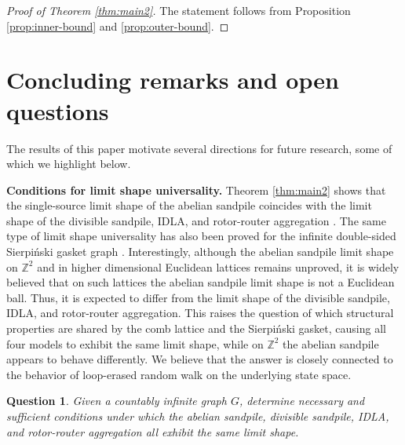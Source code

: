 \documentclass[11pt]{article}
\newtheorem{question}{Question}[section]
\begin{document}
\begin{proof}[Proof of Theorem \ref{thm:main2}]
    The statement follows from Proposition \ref{prop:inner-bound} and \ref{prop:outer-bound}.
\end{proof}

\section{Concluding remarks and open questions}

The results of this paper motivate several directions for future research, some of which we highlight below.

\textbf{Conditions for limit shape universality.} Theorem \ref{thm:main2} shows that the single-source limit shape of the abelian sandpile coincides with the limit shape of the divisible sandpile, IDLA, and rotor-router aggregation \cite{IDLA-comb-2012}. The same type of limit shape universality has also been proved for the infinite double-sided Sierpi\'nski gasket graph \cite{CK20, IDLA-gasket-2020, Div-sand-gasket-2019}. 
Interestingly, although the abelian sandpile limit shape on $\mathbb{Z}^2$ and in higher dimensional Euclidean lattices remains unproved, it is widely believed that on such lattices the abelian sandpile limit shape is not a Euclidean ball. Thus, it is expected to differ from the limit shape of the divisible sandpile, IDLA, and rotor-router aggregation. This raises the question of which structural properties are shared by the comb lattice and the Sierpi\'nski gasket, causing all four models to exhibit the same limit shape, while on $\mathbb{Z}^2$ the abelian sandpile appears to behave differently. We believe that the answer is closely connected to the behavior of loop-erased random walk on the underlying state space.


\begin{question}
    Given a countably infinite graph $G$, determine necessary and sufficient conditions under which the abelian sandpile, divisible sandpile, IDLA, and rotor-router aggregation all exhibit the same limit shape.
\end{question}
\end{document}

